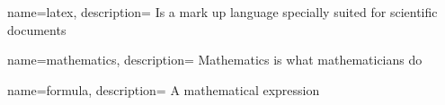 {
        name=latex,
        description= {
                Is a mark up language specially suited for scientific documents
        }
}

{
        name=mathematics,
        description={
                Mathematics is what mathematicians do
        }
}

{
        name=formula,
        description={
                A mathematical expression
        }
}


